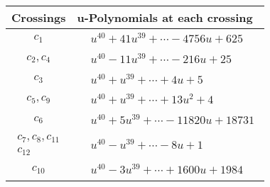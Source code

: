 \documentclass[1p]{elsarticle_modified}
\theoremstyle{definition}
\begin{document}
\begin{tabular}{m{50pt}|m{274pt}}
Crossings & \hspace{64pt}u-Polynomials at each crossing \\
\hline $$\begin{aligned}c_{1}\end{aligned}$$&$\begin{aligned}
&u^{40}+41 u^{39}+\cdots-4756 u+625
\end{aligned}$\\
\hline $$\begin{aligned}c_{2},c_{4}\end{aligned}$$&$\begin{aligned}
&u^{40}-11 u^{39}+\cdots-216 u+25
\end{aligned}$\\
\hline $$\begin{aligned}c_{3}\end{aligned}$$&$\begin{aligned}
&u^{40}+u^{39}+\cdots+4 u+5
\end{aligned}$\\
\hline $$\begin{aligned}c_{5},c_{9}\end{aligned}$$&$\begin{aligned}
&u^{40}+u^{39}+\cdots+13 u^2+4
\end{aligned}$\\
\hline $$\begin{aligned}c_{6}\end{aligned}$$&$\begin{aligned}
&u^{40}+5 u^{39}+\cdots-11820 u+18731
\end{aligned}$\\
\hline $$\begin{aligned}c_{7},c_{8},c_{11}\\c_{12}\end{aligned}$$&$\begin{aligned}
&u^{40}- u^{39}+\cdots-8 u+1
\end{aligned}$\\
\hline $$\begin{aligned}c_{10}\end{aligned}$$&$\begin{aligned}
&u^{40}-3 u^{39}+\cdots+1600 u+1984
\end{aligned}$\\
\hline
\end{tabular}\\~\\
\end{document}
